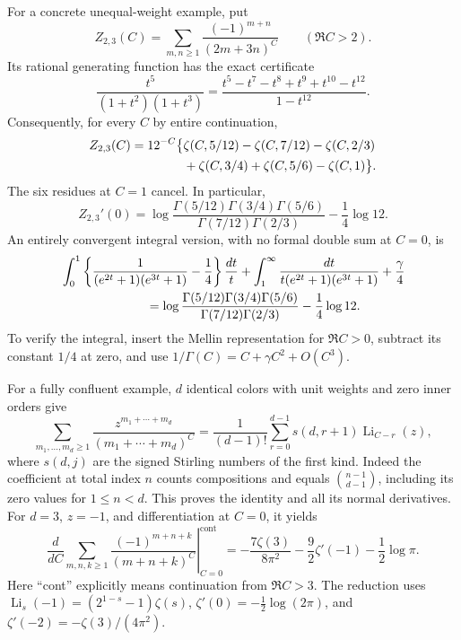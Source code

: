 For a concrete unequal-weight example, put
\[
 Z_{2,3}(C)=\sum_{m,n\geq1}\frac{(-1)^{m+n}}{(2m+3n)^C}
 \qquad(\Re C>2).
\]
Its rational generating function has the exact certificate
\begin{equation}\label{sp:weightedcertificate}
 \frac{t^5}{(1+t^2)(1+t^3)}
 =\frac{t^5-t^7-t^8+t^9+t^{10}-t^{12}}{1-t^{12}}.
\end{equation}
Consequently, for every $C$ by entire continuation,
\begin{align}\label{sp:weightedHurwitz}
 Z_{2,3}(C)=12^{-C}\bigl\{
  &\zeta(C,5/12)-\zeta(C,7/12)-\zeta(C,2/3)\notag\\
  &+\zeta(C,3/4)+\zeta(C,5/6)-\zeta(C,1)\bigr\}.
\end{align}
The six residues at $C=1$ cancel.  In particular,
\begin{equation}\label{sp:weightedGamma}
 Z_{2,3}'(0)
 =\log\frac{\Gamma(5/12)\Gamma(3/4)\Gamma(5/6)}
                 {\Gamma(7/12)\Gamma(2/3)}-\frac14\log12.
\end{equation}
An entirely convergent integral version, with no formal double sum
at $C=0$, is
\begin{align}\label{sp:weightedIntegral}
 &\int_0^1\left\{\frac1{(e^{2t}+1)(e^{3t}+1)}-\frac14\right\}
                         \frac{dt}{t}
 +\int_1^\infty\frac{dt}{t(e^{2t}+1)(e^{3t}+1)}
 +\frac\gamma4\notag\\
 &\hspace{24mm}=
 \log\frac{\Gamma(5/12)\Gamma(3/4)\Gamma(5/6)}
                 {\Gamma(7/12)\Gamma(2/3)}-\frac14\log12.
\end{align}
To verify the integral, insert the Mellin representation for
$\Re C>0$, subtract its constant $1/4$ at zero, and use
$1/\Gamma(C)=C+\gamma C^2+O(C^3)$.

For a fully confluent example, $d$ identical colors with unit weights
and zero inner orders give
\begin{equation}\label{sp:compositions}
 \sum_{m_1,\ldots,m_d\geq1}
       \frac{z^{m_1+\cdots+m_d}}{(m_1+\cdots+m_d)^C}
 =\frac1{(d-1)!}\sum_{r=0}^{d-1}s(d,r+1)
                         \operatorname{Li}_{C-r}(z),
\end{equation}
where $s(d,j)$ are the signed Stirling numbers of the first kind.
Indeed the coefficient at total index $n$ counts compositions and
equals $\binom{n-1}{d-1}$, including its zero values for $1\leq n<d$.
This proves the identity and all its normal derivatives.  For $d=3$,
$z=-1$, and differentiation at $C=0$, it yields
\begin{equation}\label{sp:triplealternating}
 \left.\frac{d}{dC}
 \sum_{m,n,k\geq1}\frac{(-1)^{m+n+k}}{(m+n+k)^C}
 \right|_{C=0}^{\mathrm{cont}}
 =-\frac{7\zeta(3)}{8\pi^2}
   -\frac92\zeta'(-1)-\frac12\log\pi.
\end{equation}
Here ``cont'' explicitly means continuation from $\Re C>3$.
The reduction uses
$\operatorname{Li}_s(-1)=(2^{1-s}-1)\zeta(s)$,
$\zeta'(0)=-\tfrac12\log(2\pi)$, and
$\zeta'(-2)=-\zeta(3)/(4\pi^2)$.

